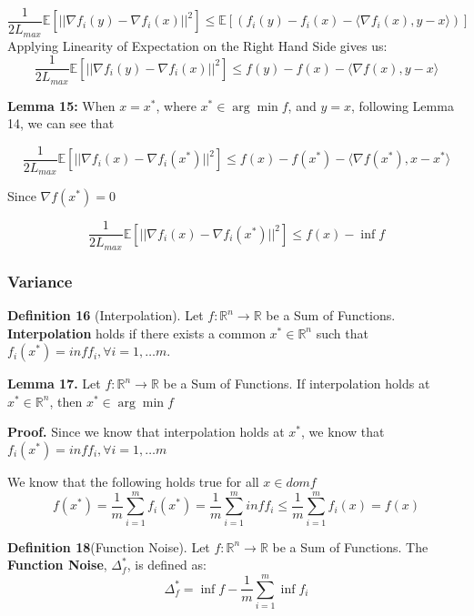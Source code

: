 \begin{equation}
    \frac{1}{2L_{max}} \mathbb{E}[||\nabla f_i(y) - \nabla f_i(x)||^2] \leq \mathbb{E}[(f_i(y) - f_i(x) - \langle \nabla f_i(x), y - x \rangle)]
\end{equation}
\noindent Applying Linearity of Expectation on the Right Hand Side gives us: 
\begin{equation}
    \frac{1}{2L_{max}} \mathbb{E}[||\nabla f_i(y) - \nabla f_i(x)||^2] \leq f(y) - f(x) - \langle \nabla f(x), y - x \rangle
\end{equation}


\noindent \textbf{Lemma 15:} When $x = x^*$, where $x^* \in \arg \min f$, and $y = x$, following Lemma 14, we can see that 

\begin{equation}
    \frac{1}{2L_{max}} \mathbb{E}[||\nabla f_i(x) - \nabla f_i(x^*)||^2] \leq f(x) - f(x^*) - \langle \nabla f(x^*), x - x^* \rangle
\end{equation}

Since $\nabla f(x^*) = 0$ 

\begin{equation}
    \frac{1}{2L_{max}} \mathbb{E}[||\nabla f_i(x) - \nabla f_i(x^*)||^2] \leq f(x) - \inf f
\end{equation}

\subsubsection{Variance}
\noindent \textbf{Definition 16} (Interpolation). Let $f: \mathbb{R}^n \rightarrow \mathbb{R}$ be a Sum of Functions. \textbf{Interpolation} holds if there exists a common $x^* \in \mathbb{R}^n$ such that $f_i(x^*) = inf f_i, \forall i = 1, \dots m$. 

\noindent \textbf{Lemma 17.} Let $f: \mathbb{R}^n \rightarrow \mathbb{R}$ be a Sum of Functions. If interpolation holds at $x^* \in \mathbb{R}^n$, then $x^* \in \arg \min f$

\noindent \textbf{Proof.} 
Since we know that interpolation holds at $x^*$, we know that $f_i(x^*) = inf f_i, \forall i = 1, \dots m$

We know that the following holds true for all $x \in dom f$
\begin{equation}
    f(x^*) = \frac{1}{m} \sum_{i=1}^{m} f_i(x^*) = \frac{1}{m} \sum_{i=1}^{m} inf f_i \leq \frac{1}{m} \sum_{i=1}^{m} f_i(x) = f(x)
\end{equation}

\noindent \textbf{Definition 18}(Function Noise).  Let $f: \mathbb{R}^n \rightarrow \mathbb{R}$ be a Sum of Functions. The \textbf{Function Noise}, $\Delta^*_f$, is defined as:
\begin{equation}
    \Delta^*_f = \inf f - \frac{1}{m} \sum_{i=1}^{m} \inf f_i
\end{equation}

